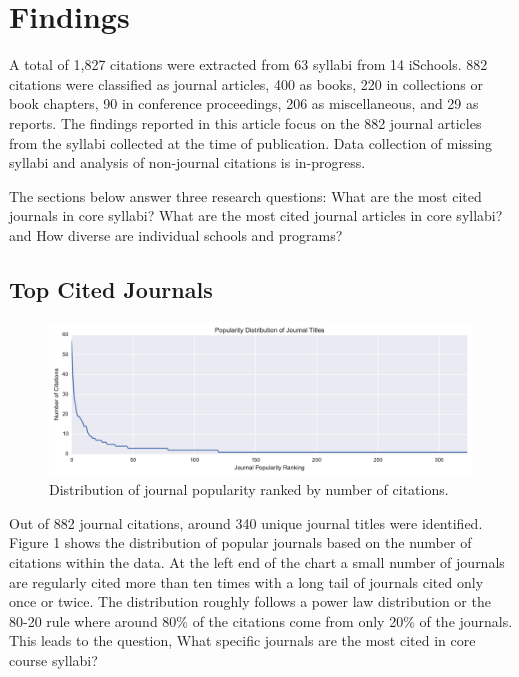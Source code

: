 \documentclass[10pt, letterpaper]{article}
\begin{document}
\section{Findings}
A total of 1,827 citations were extracted from 63 syllabi from 14 iSchools. 882 citations were classified as journal articles, 400 as books, 220 in collections or book chapters, 90 in conference proceedings, 206 as miscellaneous, and 29 as reports. The findings reported in this article focus on the 882 journal articles from the syllabi collected at the time of publication. Data collection of missing syllabi and analysis of non-journal citations is in-progress.

The sections below answer three research questions: What are the most cited journals in core syllabi? What are the most cited journal articles in core syllabi? and How diverse are individual schools and programs?

\subsection{Top Cited Journals}

\begin{figure}[h]
\includegraphics[width=\textwidth]{popular-journals.pdf} 
\caption{Distribution of journal popularity ranked by number of citations.} 
\end{figure}

Out of 882 journal citations, around 340 unique journal titles were identified. Figure 1 shows the distribution of popular journals based on the number of citations within the data. At the left end of the chart a small number of journals are regularly cited more than ten times with a long tail of journals cited only once or twice. The distribution roughly follows a power law distribution or the 80-20 rule where around 80\% of the citations come from only 20\% of the journals. This leads to the question, What specific journals are the most cited in core course syllabi?
\end{document}
